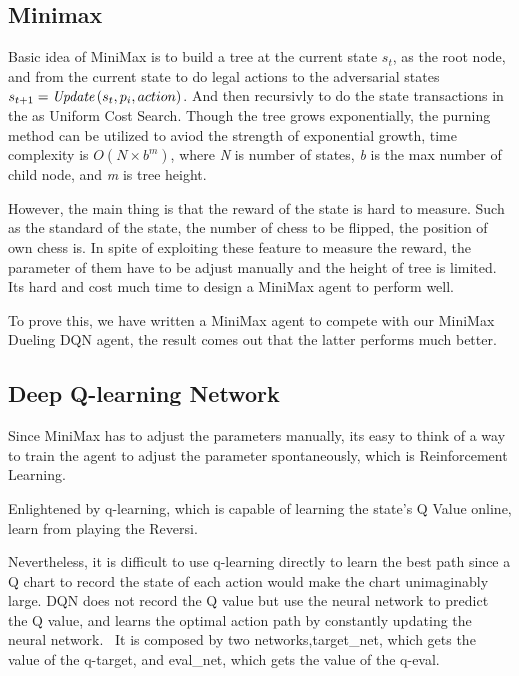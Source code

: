 \documentclass[10pt,twocolumn,letterpaper]{article}
\begin{document}
\subsection{Minimax}

Basic idea of MiniMax is to build a tree at the 
current state $s_t$, as the root node, and from the 
current state to do legal actions to the adversarial 
states $s_{t+1} = \emph{Update}\left(s_{t}, p_{i}, action \right)$.
And then recursivly to do the state transactions 
in the as Uniform Cost Search. Though the tree grows 
exponentially, the purning method can be utilized 
to aviod the strength of exponential growth, time complexity 
is $O\left(N\times b^{m}\right)$, where \emph{N} is number of 
states, \emph{b} is the max number of child node, and \emph{m} is 
tree height.  

However, the main thing is that the reward of the 
state is hard to measure. Such as the standard of the 
state, the number of chess to be flipped, the position 
of own chess is. In spite of exploiting these 
feature to measure the reward, the parameter of 
them have to be adjust manually and the height of 
tree is limited. Its hard and cost much time 
to design a MiniMax agent to perform well. 

To prove this, we have written a MiniMax agent to compete 
with our MiniMax Dueling DQN agent, the result 
comes out that the latter performs much better.


\subsection{Deep Q-learning Network}
Since MiniMax has to adjust the parameters manually, 
its easy to think of a way to train the agent to 
adjust the parameter spontaneously, which is Reinforcement Learning. 

Enlightened by q-learning, which is capable of learning the 
state's Q Value online, learn from playing the Reversi.


Nevertheless, it is difficult to use q-learning directly to learn the best path since a Q chart to record the state of each action would make the chart unimaginably large. DQN does not record the Q value but use the neural network to predict the Q value, and learns the optimal action path by constantly updating the neural network.~\cite{DBLP:journals/corr/MnihKSGAWR13}
It is composed by two networks,target\_net, which gets the value of the q-target, and eval\_net, which gets the value of the q-eval.\\
\end{document}
